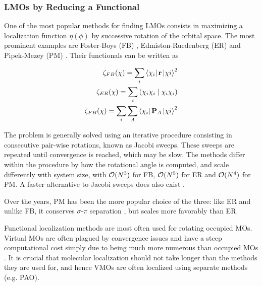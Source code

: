 \subsubsection{LMOs by Reducing a Functional}

One of the most popular methods for finding LMOs consists in maximizing a localization function $\eta(\phi)$ by successive rotation of the orbital space. The most prominent examples are Foster-Boys (FB) \cite{Boy1960}, Edmiston-Ruedenberg (ER) \cite{Edm1963} and Pipek-Mezey (PM) \cite{Pip1989}. Their functionals can be written as

\begin{eqnarray}
\zeta_{FB}(\chi) = \sum_i \bra{\chi_i} \mathbf{r} \ket{\chi i}^2 \\
\zeta_{ER}(\chi) = \sum_i \left( \chi_i \chi_i \mid \chi_i \chi_i \right) \\
\zeta_{FB}(\chi) = \sum_i \sum_A \bra{\chi_i} \mathbf{P}_A \ket{\chi i}^2 
\end{eqnarray}

The problem is generally solved using an iterative procedure consisting in consecutive pair-wise rotations, known as Jacobi sweeps. These sweeps are repeated until convergence is reached, which may be slow. The methods differ within the procedure by how the rotational angle is computed, and scale differently with system size, with $\mathcal{O}(N^{3})$ for FB, $\mathcal{O}(N^{5})$ for ER and $\mathcal{O}(N^{4})$ for PM. A faster alternative to Jacobi sweeps does also exist \cite{Sub2004}. 

Over the years, PM has been the more popular choice of the three: like ER and unlike FB, it conserves $\sigma$-$\pi$ separation \cite{Aqu2006}, but scales more favorably than ER.

Functional localization methods are most often used for rotating occupied MOs. Virtual MOs are often plagued by convergence issues and have a steep computational cost simply due to being much more numerous than occupied MOs \cite{Sub2005}. It is crucial that molecular localization should not take longer than the methods they are used for, and hence VMOs are often localized using separate methods (e.g. PAO).

